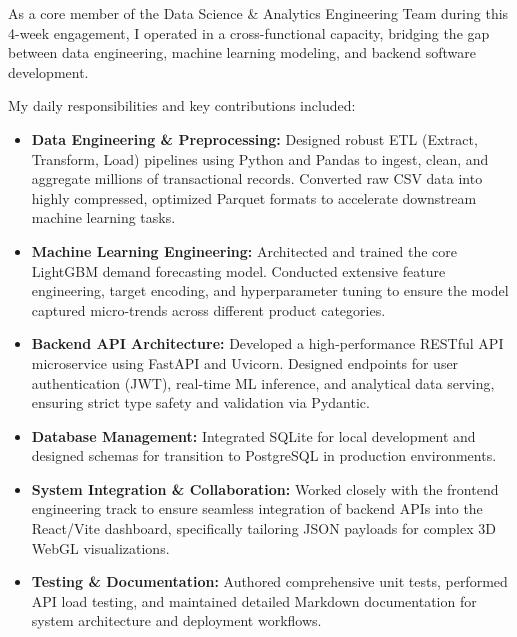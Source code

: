 \documentclass[12pt,a4paper]{report}
\begin{document}
As a core member of the Data Science \& Analytics Engineering Team during this 4-week engagement, I operated in a cross-functional capacity, bridging the gap between data engineering, machine learning modeling, and backend software development. 

My daily responsibilities and key contributions included:
\begin{itemize}
    \item \textbf{Data Engineering \& Preprocessing:} Designed robust ETL (Extract, Transform, Load) pipelines using Python and Pandas to ingest, clean, and aggregate millions of transactional records. Converted raw CSV data into highly compressed, optimized Parquet formats to accelerate downstream machine learning tasks.
    \item \textbf{Machine Learning Engineering:} Architected and trained the core LightGBM demand forecasting model. Conducted extensive feature engineering, target encoding, and hyperparameter tuning to ensure the model captured micro-trends across different product categories.
    \item \textbf{Backend API Architecture:} Developed a high-performance RESTful API microservice using FastAPI and Uvicorn. Designed endpoints for user authentication (JWT), real-time ML inference, and analytical data serving, ensuring strict type safety and validation via Pydantic.
    \item \textbf{Database Management:} Integrated SQLite for local development and designed schemas for transition to PostgreSQL in production environments.
    \item \textbf{System Integration \& Collaboration:} Worked closely with the frontend engineering track to ensure seamless integration of backend APIs into the React/Vite dashboard, specifically tailoring JSON payloads for complex 3D WebGL visualizations.
    \item \textbf{Testing \& Documentation:} Authored comprehensive unit tests, performed API load testing, and maintained detailed Markdown documentation for system architecture and deployment workflows.
\end{itemize}
\end{document}
